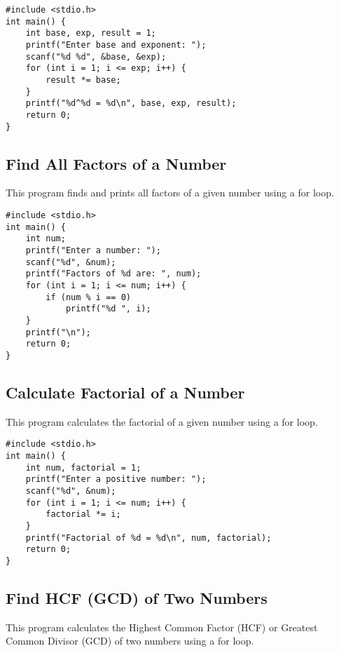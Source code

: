 \documentclass[a4paper,12pt]{article}
\begin{document}
\begin{lstlisting}[caption={Find Power of a Number Using For Loop}]
#include <stdio.h>
int main() {
    int base, exp, result = 1;
    printf("Enter base and exponent: ");
    scanf("%d %d", &base, &exp);
    for (int i = 1; i <= exp; i++) {
        result *= base;
    }
    printf("%d^%d = %d\n", base, exp, result);
    return 0;
}
\end{lstlisting}

\newpage

\subsection{Find All Factors of a Number}
This program finds and prints all factors of a given number using a for loop.

\begin{lstlisting}[caption={Find All Factors of a Number}]
#include <stdio.h>
int main() {
    int num;
    printf("Enter a number: ");
    scanf("%d", &num);
    printf("Factors of %d are: ", num);
    for (int i = 1; i <= num; i++) {
        if (num % i == 0)
            printf("%d ", i);
    }
    printf("\n");
    return 0;
}
\end{lstlisting}

\newpage

\subsection{Calculate Factorial of a Number}
This program calculates the factorial of a given number using a for loop.

\begin{lstlisting}[caption={Calculate Factorial of a Number}]
#include <stdio.h>
int main() {
    int num, factorial = 1;
    printf("Enter a positive number: ");
    scanf("%d", &num);
    for (int i = 1; i <= num; i++) {
        factorial *= i;
    }
    printf("Factorial of %d = %d\n", num, factorial);
    return 0;
}
\end{lstlisting}

\newpage

\subsection{Find HCF (GCD) of Two Numbers}
This program calculates the Highest Common Factor (HCF) or Greatest Common Divisor (GCD) of two numbers using a for loop.
\end{document}
